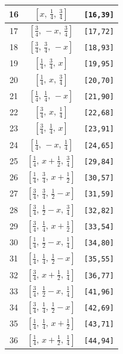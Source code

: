 \documentclass[fleqn,8pt]{jsarticle}
\begin{document}
\begin{longtable}{ccc}
16 & $\left[ x,\, \frac{1}{4},\, \frac{3}{4} \right]$ & {\tt [16,39]} \\ \hline
17 & $\left[ \frac{3}{4},\, - x,\, \frac{3}{4} \right]$ & {\tt [17,72]} \\ \hline
18 & $\left[ \frac{3}{4},\, \frac{3}{4},\, - x \right]$ & {\tt [18,93]} \\ \hline
19 & $\left[ \frac{1}{4},\, \frac{3}{4},\, x \right]$ & {\tt [19,95]} \\ \hline
20 & $\left[ \frac{1}{4},\, x,\, \frac{3}{4} \right]$ & {\tt [20,70]} \\ \hline
21 & $\left[ \frac{1}{4},\, \frac{1}{4},\, - x \right]$ & {\tt [21,90]} \\ \hline
22 & $\left[ \frac{3}{4},\, x,\, \frac{1}{4} \right]$ & {\tt [22,68]} \\ \hline
23 & $\left[ \frac{3}{4},\, \frac{1}{4},\, x \right]$ & {\tt [23,91]} \\ \hline
24 & $\left[ \frac{1}{4},\, - x,\, \frac{1}{4} \right]$ & {\tt [24,65]} \\ \hline
25 & $\left[ \frac{1}{4},\, x + \frac{1}{2},\, \frac{3}{4} \right]$ & {\tt [29,84]} \\ \hline
26 & $\left[ \frac{1}{4},\, \frac{3}{4},\, x + \frac{1}{2} \right]$ & {\tt [30,57]} \\ \hline
27 & $\left[ \frac{3}{4},\, \frac{3}{4},\, \frac{1}{2} - x \right]$ & {\tt [31,59]} \\ \hline
28 & $\left[ \frac{3}{4},\, \frac{1}{2} - x,\, \frac{3}{4} \right]$ & {\tt [32,82]} \\ \hline
29 & $\left[ \frac{3}{4},\, \frac{1}{4},\, x + \frac{1}{2} \right]$ & {\tt [33,54]} \\ \hline
30 & $\left[ \frac{1}{4},\, \frac{1}{2} - x,\, \frac{1}{4} \right]$ & {\tt [34,80]} \\ \hline
31 & $\left[ \frac{1}{4},\, \frac{1}{4},\, \frac{1}{2} - x \right]$ & {\tt [35,55]} \\ \hline
32 & $\left[ \frac{3}{4},\, x + \frac{1}{2},\, \frac{1}{4} \right]$ & {\tt [36,77]} \\ \hline
33 & $\left[ \frac{3}{4},\, \frac{1}{2} - x,\, \frac{1}{4} \right]$ & {\tt [41,96]} \\ \hline
34 & $\left[ \frac{3}{4},\, \frac{1}{4},\, \frac{1}{2} - x \right]$ & {\tt [42,69]} \\ \hline
35 & $\left[ \frac{1}{4},\, \frac{1}{4},\, x + \frac{1}{2} \right]$ & {\tt [43,71]} \\ \hline
36 & $\left[ \frac{1}{4},\, x + \frac{1}{2},\, \frac{1}{4} \right]$ & {\tt [44,94]} \\ \hline

\end{longtable}
\end{document}
